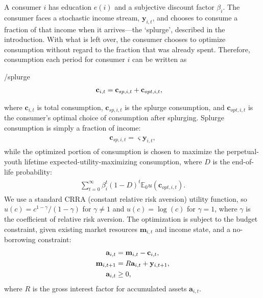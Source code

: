 \documentclass[\econtexRoot/HAFiscal]{subfiles}
\begin{document}
A consumer $i$ has education $e(i)$ and a subjective discount factor $\beta_i$. The consumer faces a stochastic income stream, $\mathbf{y}_{i,t}$, and chooses to consume a fraction of that income when it arrives---the `splurge', described in the introduction. With what is left over, the consumer chooses to optimize consumption without regard to the fraction that was already spent. Therefore, consumption each period for consumer $i$ can be written as
\begin{verbatimwrite}{\EqDir/splurge}
\begin{equation}\begin{gathered}\begin{aligned}
  \mathbf{c}_{i,t} &= \mathbf{c}_{sp,i,t} + \mathbf{c}_{opt,i,t}, \label{eq:model}
\end{aligned}\end{gathered}\end{equation}
\end{verbatimwrite}

where $\mathbf{c}_{i,t}$ is total consumption, $\mathbf{c}_{sp,i,t}$ is the splurge consumption, and $\mathbf{c}_{opt,i,t}$ is the consumer's optimal choice of consumption after splurging.
Splurge consumption is simply a fraction of income:
\begin{equation}\begin{gathered}\begin{aligned}
  \mathbf{c}_{sp,i,t} = \varsigma \mathbf{y}_{i,t},
\end{aligned}\end{gathered}\end{equation}
while the optimized portion of consumption is chosen to maximize the perpetual-youth lifetime expected-utility-maximizing consumption, where $D$ is the end-of-life probability:
\begin{equation}\begin{gathered}\begin{aligned}
  \sum_{t=0}^{\infty}\beta_i^t (1-D)^t \mathbb{E}_0 u(\mathbf{c}_{opt,i,t}).
\end{aligned}\end{gathered}\end{equation}
We use a standard CRRA (constant relative risk aversion) utility function, so $u(c) = c^{1-\gamma}/(1-\gamma)$ for $\gamma \neq 1$ and $u(c) = \log(c)$ for $\gamma=1$, where $\gamma$ is the coefficient of relative risk aversion.
The optimization is subject to the budget constraint, given existing market resources $\mathbf{m}_{i,t}$ and income state, and a no-borrowing constraint: 
\begin{equation}\begin{gathered}\begin{aligned}
  \mathbf{a}_{i,t} &= \mathbf{m}_{i,t} - \mathbf{c}_{i,t}, \notag \\ 
  \mathbf{m}_{i,t+1} &= R \mathbf{a}_{i,t} + \mathbf{y}_{i,t+1}, \\
  \mathbf{a}_{i,t} &\geq 0,   \notag
\end{aligned}\end{gathered}\end{equation}
where $R$ is the gross interest factor for accumulated assets $\mathbf{a}_{i,t}$.
\end{document}
